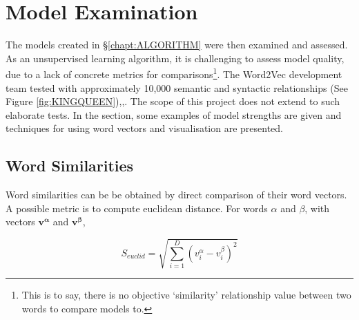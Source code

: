\chapter{Model Examination}
\label{chapt:VALIDATION}
The models created in \S\ref{chapt:ALGORITHM} were then examined and assessed. As an unsupervised learning algorithm, it is challenging to assess model quality, due to a lack of concrete metrics for comparisons\footnote{This is to say, there is no objective `similarity' relationship value between two words to compare models to.}. The Word2Vec development team tested with approximately 10,000 semantic and syntactic relationships (See Figure \ref{fig:KINGQUEEN})\cite{word2vec1},\cite{word2vec2},\cite{word2veckingqueen}. The scope of this project does not extend to such elaborate tests. In the section, some examples of model strengths are given and techniques for using word vectors and visualisation are presented. 
\section{Word Similarities}
Word similarities can be be obtained by direct comparison of their word vectors. A possible metric is to compute euclidean distance.  For words $\alpha$ and $\beta$, with vectors $\mathbf{v^\alpha}$ and $\mathbf{v^\beta}$, 

$$S_{euclid} = \sqrt{\sum_{i=1}^{D}(v_i^{\alpha}-v_i^{\beta})^{2}} $$

